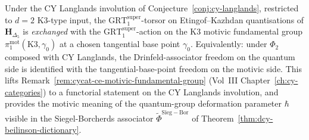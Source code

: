 \begin{conjecture}
\label{conj:gl-cy-langlands-grt-torsor-exchange}
\ClaimStatusConjectured
Under the CY Langlands involution of
Conjecture~\textup{\ref{conj:cy-langlands}}, restricted to $d = 2$
K3-type input, the $\mathrm{GRT}_1^{\mathrm{super}}$-torsor on
Etingof--Kazhdan quantisations of $\mathbf{H}_{\Delta_5}$ is
\emph{exchanged} with the $\mathrm{GRT}_1^{\mathrm{super}}$-action
on the K3 motivic fundamental group
$\pi_1^{\mathrm{mot}}(\mathrm{K3}, \gamma_0)$ at a chosen tangential
base point $\gamma_0$. Equivalently: under $\Phi_2$ composed with
CY Langlands, the Drinfeld-associator freedom on the quantum
side is identified with the tangential-base-point freedom on
the motivic side. This lifts
Remark~\textup{\ref{rem:cycat-ce-motivic-fundamental-group}}
(Vol~III Chapter~\textup{\ref{ch:cy-categories}}) to a functorial
statement on the CY Langlands involution, and provides the motivic
meaning of the quantum-group deformation parameter $\hbar$ visible
in the Siegel-Borcherds associator $\widetilde\Phi^{\mathrm{Sieg-Bor}}$
of Theorem~\textup{\ref{thm:dcy-beilinson-dictionary}}.
\end{conjecture}

